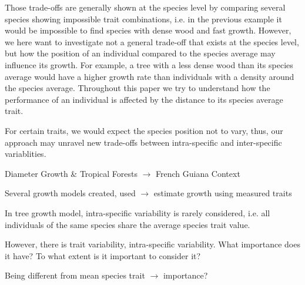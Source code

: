 Those trade-offs are generally shown at the species level by comparing several species showing impossible trait combinations, i.e. in the previous example it would be impossible to find species with dense wood and fast growth. However, we here want to investigate not a general trade-off that exists at the species level, but how the position of an individual compared to the species average may influence its growth. For example, a tree with a less dense wood than its species average would have a higher growth rate than individuals with a density around the species average. Throughout this paper we try to understand how the performance of an individual is affected by the distance to its species average trait.

For certain traits, we would expect the species position not to vary, thus, our approach may unravel new trade-offs between intra-specific and inter-specific variablities.

Diameter Growth \& Tropical Forests $\rightarrow$ French Guiana Context

Several growth models created, used $\rightarrow$ estimate growth using measured traits

In tree growth model, intra-specific variability is rarely considered, i.e. all individuals of the same species share the average species trait value.

However, there is trait variability, intra-specific variability. What importance does it have? To what extent is it important to consider it? 

Being different from mean species trait $\rightarrow$ importance?

